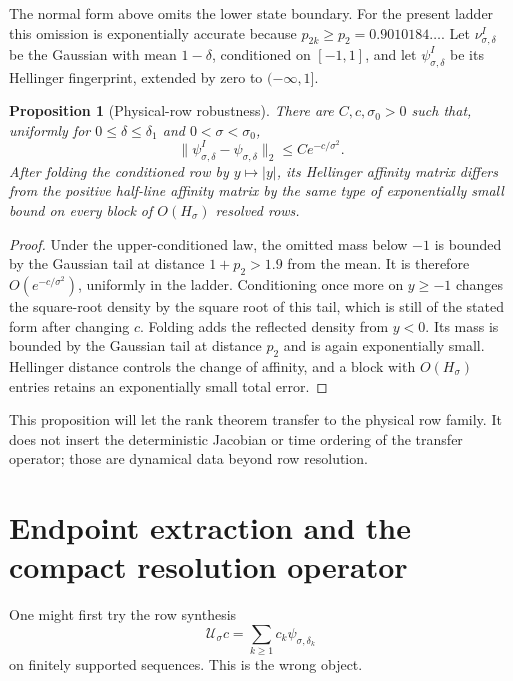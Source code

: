 \documentclass[11pt]{article}
\newtheorem{proposition}[theorem]{Proposition}
\theoremstyle{definition}
\theoremstyle{remark}
\newcommand{\cU}{\mathcal U}
\begin{document}
The normal form above omits the lower state boundary.  For the present ladder
this omission is exponentially accurate because
$p_{2k}\ge p_2=0.9010184\ldots$.  Let $\nu^I_{\sigma,\delta}$ be the Gaussian
with mean $1-\delta$, conditioned on $[-1,1]$, and let
$\psi^I_{\sigma,\delta}$ be its Hellinger fingerprint, extended by zero to
$(-\infty,1]$.

\begin{proposition}[Physical-row robustness]
\label{prop:physical-rows}
There are $C,c,\sigma_0>0$ such that, uniformly for
$0\le\delta\le\delta_1$ and $0<\sigma<\sigma_0$,
\begin{equation}\label{eq:interval-row-error}
 \|\psi^I_{\sigma,\delta}-\psi_{\sigma,\delta}\|_2
 \le Ce^{-c/\sigma^2}.
\end{equation}
After folding the conditioned row by $y\mapsto|y|$, its Hellinger affinity
matrix differs from the positive half-line affinity matrix by the same type
of exponentially small bound on every block of $O(H_\sigma)$ resolved rows.
\end{proposition}

\begin{proof}
Under the upper-conditioned law, the omitted mass below $-1$ is bounded by
the Gaussian tail at distance $1+p_2>1.9$ from the mean.  It is therefore
$O(e^{-c/\sigma^2})$, uniformly in the ladder.  Conditioning once more on
$y\ge-1$ changes the square-root density by the square root of this tail,
which is still of the stated form after changing $c$.  Folding adds the
reflected density from $y<0$.  Its mass is bounded by the Gaussian tail at
distance $p_2$ and is again exponentially small.  Hellinger distance controls
the change of affinity, and a block with $O(H_\sigma)$ entries retains an
exponentially small total error.
\end{proof}

This proposition will let the rank theorem transfer to the physical row
family.  It does not insert the deterministic Jacobian or time ordering of
the transfer operator; those are dynamical data beyond row resolution.

\section{Endpoint extraction and the compact resolution operator}
\label{sec:resolution-operator}

One might first try the row synthesis
\begin{equation}\label{eq:uncentered-synthesis}
 \cU_\sigma c
 =\sum_{k\ge1}c_k\psi_{\sigma,\delta_k}
\end{equation}
on finitely supported sequences.  This is the wrong object.
\end{document}
